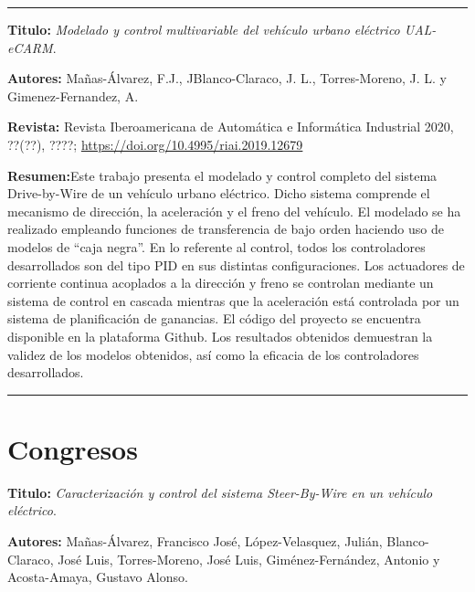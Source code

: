 \vspace{6pt} \hrule \vspace{6pt}

\textbf{Titulo:} \textit{Modelado y control multivariable del vehículo urbano eléctrico UAL-eCARM}\cite{manas2020byWire}.

\textbf{Autores:} Mañas-Álvarez, F.J., JBlanco-Claraco, J. L., Torres-Moreno, J. L. y Gimenez-Fernandez, A.

\textbf{Revista:} Revista Iberoamericana de Automática e Informática Industrial 2020, ??(??), ????; \url{https://doi.org/10.4995/riai.2019.12679}

\textbf{Resumen:}Este trabajo presenta el modelado y control completo del sistema Drive-by-Wire de un vehículo urbano eléctrico. Dicho sistema comprende el mecanismo de dirección, la aceleración y el freno del vehículo. El modelado se ha realizado empleando funciones de transferencia de bajo orden haciendo uso de modelos de “caja negra”. En lo referente al control, todos los controladores desarrollados son del tipo PID en sus distintas configuraciones. Los actuadores de corriente continua acoplados a la dirección y freno se controlan mediante un sistema de control en cascada mientras que la aceleración está controlada por un sistema de planificación de ganancias. El código del proyecto se encuentra disponible en la plataforma Github. Los resultados obtenidos demuestran la validez de los modelos obtenidos, así como la eficacia de los controladores desarrollados.

\vspace{6pt} \hrule \vspace{6pt}

\section{Congresos}
\textbf{Titulo:} \textit{Caracterización y control del sistema Steer-By-Wire en un vehículo eléctrico}\cite{manas2019CIBIM}.

\textbf{Autores:} Mañas-Álvarez, Francisco José, López-Velasquez, Julián, Blanco-Claraco, José Luis, Torres-Moreno, José Luis, Giménez-Fernández, Antonio y Acosta-Amaya, Gustavo Alonso.

